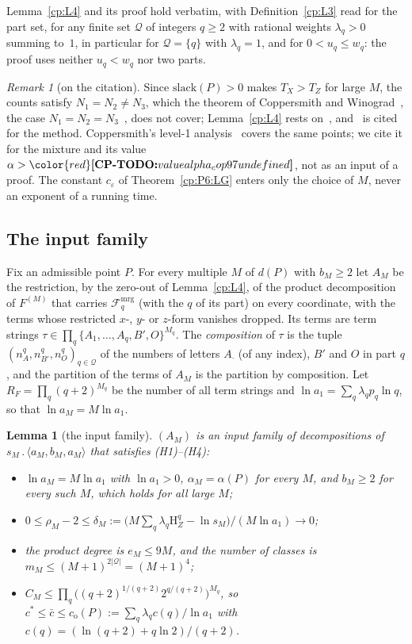 \documentclass[11pt]{article}
\makeatletter
\newtheorem{lemma}[theorem]{Lemma}
\theoremstyle{definition}
\theoremstyle{remark}
\newtheorem{remark}[theorem]{Remark}
\DeclareRobustCommand{\CPTODO}[1]{{\color{red}\textbf{[CP-TODO:} #1\textbf{]}}}
\providecommand{\eps}{\varepsilon}
\newcommand{\abs}[1]{\lvert #1\rvert}
\newcommand{\Ent}{\mathrm{H}}                 %
\newcommand{\mat}[3]{\langle #1,#2,#3\rangle} %
\newcommand{\cp}{\mathbin{.}}                 %
\newcommand{\cstar}{c^{*}}                    %
\newcommand{\cbar}{\bar c}                    %
\newcommand{\co}{c_{\mathrm o}}               %
\newcommand{\Hcond}[1]{\textup{(H#1)}}        %
\newcommand{\Qs}{\mathcal{Q}}                 %
\newcommand{\slack}{\mathrm{slack}}           %
\newcommand{\Fmrg}{\mathcal{F}^{\mathrm{mrg}}_q} %
\newcommand{\Bp}{B'}                          %
\newcommand{\Oterm}{O}                        %
\newcommand{\cpv}[1]{\ifcsname cpv@#1\endcsname\csname cpv@#1\endcsname\else\CPTODO{value #1 undefined}\fi}
\makeatother
\begin{document}
\label{cp:rem:L4parts}%
Lemma~\ref{cp:L4} and its proof hold verbatim, with Definition~\ref{cp:L3} read for the part set, for any finite set $\Qs$ of integers $q\ge2$ with rational weights $\lambda_q>0$ summing to~$1$, in particular for $\Qs=\{q\}$ with $\lambda_q=1$, and for $0<u_q\le w_q$: the proof uses neither $u_q<w_q$ nor two parts.

\begin{remark}[on the citation]\label{cp:rem:LGcite}
Since $\slack(P)>0$ makes $T_X>T_Z$ for large $M$, the counts satisfy $N_1=N_2\ne N_3$, which the theorem of Coppersmith and Winograd~\cite{CW90}, the case $N_1=N_2=N_3$~\cite[Theorem~4.1]{LG12}, does not cover; Lemma~\ref{cp:L4} rests on~\cite[Theorem~4.2]{LG12}, and~\cite{CW90} is cited for the method. Coppersmith's level-1 analysis~\cite{Cop97} covers the same points; we cite it for the mixture and its value $\alpha>\cpv{alpha_cop97}$, not as an input of a proof. The constant $c_\eps$ of Theorem~\ref{cp:P6:LG} enters only the choice of $M$, never an exponent of a running time.
\end{remark}

\subsection{The input family}\label{cp:sec:family}

Fix an admissible point $P$. For every multiple $M$ of $d(P)$ with $b_M\ge2$ let $A_M$ be the restriction, by the zero-out of Lemma~\ref{cp:L4}, of the product decomposition of $F^{(M)}$ that carries $\Fmrg$ (with the $q$ of its part) on every coordinate, with the terms whose restricted $x$-, $y$- or $z$-form vanishes dropped. Its terms are term strings $\tau\in\prod_q\{A_1,\dots,A_q,\Bp,\Oterm\}^{M_q}$. The \emph{composition} of $\tau$ is the tuple $(n^q_A,n^q_{\Bp},n^q_{\Oterm})_{q\in\Qs}$ of the numbers of letters $A_\cdot$ (of any index), $\Bp$ and $\Oterm$ in part $q$, and the partition of the terms of $A_M$ is the partition by composition. Let $R_F=\prod_q(q+2)^{M_q}$ be the number of all term strings and $\ln a_1=\sum_q\lambda_qp_q\ln q$, so that $\ln a_M=M\ln a_1$.

\begin{lemma}[the input family]\label{cp:L5}
$(A_M)$ is an input family of decompositions of $s_M\cp\mat{a_M}{b_M}{a_M}$ that satisfies \Hcond1--\Hcond4:
\begin{itemize}
\item[\Hcond1] $\ln a_M=M\ln a_1$ with $\ln a_1>0$, $\alpha_M=\alpha(P)$ for every $M$, and $b_M\ge2$ for every such $M$, which holds for all large $M$;
\item[\Hcond2] $0\le\rho_M-2\le\delta_M:=\bigl(M\sum_q\lambda_q\Ent^q_Z-\ln s_M\bigr)/(M\ln a_1)\to0$;
\item[\Hcond3] the product degree is $e_M\le9M$, and the number of classes is $m_M\le(M+1)^{2\abs\Qs}=(M+1)^4$;
\item[\Hcond4] $C_M\le\prod_q\bigl((q+2)^{1/(q+2)}2^{q/(q+2)}\bigr)^{M_q}$, so $\cstar\le\cbar\le\co(P):=\sum_q\lambda_qc(q)/\ln a_1$ with $c(q)=(\ln(q+2)+q\ln2)/(q+2)$.
\end{itemize}
\end{lemma}
\end{document}
